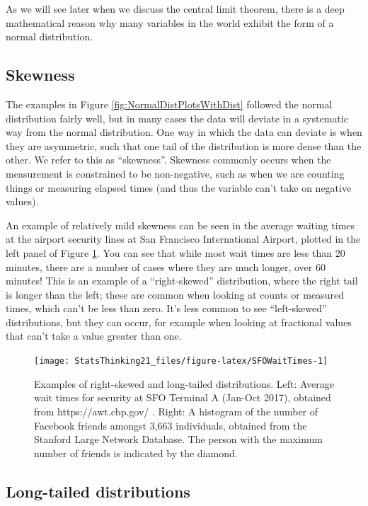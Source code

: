 \documentclass[
  12pt,
]{book}
\begin{document}
As we will see later when we discuss the central limit theorem, there is a deep mathematical reason why many variables in the world exhibit the form of a normal distribution.

\hypertarget{skewness}{%
\subsection{Skewness}\label{skewness}}

The examples in Figure \ref{fig:NormalDistPlotsWithDist} followed the normal distribution fairly well, but in many cases the data will deviate in a systematic way from the normal distribution. One way in which the data can deviate is when they are asymmetric, such that one tail of the distribution is more dense than the other. We refer to this as ``skewness''. Skewness commonly occurs when the measurement is constrained to be non-negative, such as when we are counting things or measuring elapsed times (and thus the variable can't take on negative values).

An example of relatively mild skewness can be seen in the average waiting times at the airport security lines at San Francisco International Airport, plotted in the left panel of Figure \ref{fig:SFOWaitTimes}. You can see that while most wait times are less than 20 minutes, there are a number of cases where they are much longer, over 60 minutes! This is an example of a ``right-skewed'' distribution, where the right tail is longer than the left; these are common when looking at counts or measured times, which can't be less than zero. It's less common to see ``left-skewed'' distributions, but they can occur, for example when looking at fractional values that can't take a value greater than one.

\begin{figure}
\texttt{[image: StatsThinking21\_files/figure-latex/SFOWaitTimes-1]} \caption{Examples of right-skewed and long-tailed distributions.  Left: Average wait times for security at SFO Terminal A (Jan-Oct 2017), obtained from https://awt.cbp.gov/ .  Right: A histogram of the number of Facebook friends amongst 3,663 individuals, obtained from the Stanford Large Network Database. The person with the maximum number of friends is indicated by the diamond.}\label{fig:SFOWaitTimes}
\end{figure}

\hypertarget{long-tailed-distributions}{%
\subsection{Long-tailed distributions}\label{long-tailed-distributions}}
\end{document}
